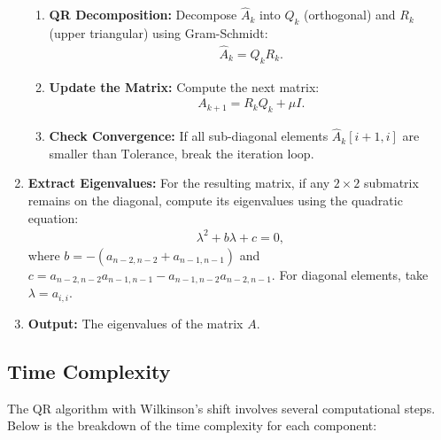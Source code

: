 \documentclass[journal]{IEEEtran}
\begin{document}
\begin{enumerate}
\begin{enumerate}
        \item \textbf{QR Decomposition:} Decompose $\hat{A}_k$ into $Q_k$ (orthogonal) and $R_k$ (upper triangular) using Gram-Schmidt:
        \begin{align}
        \hat{A}_k = Q_k R_k.
        \end{align}

        \item \textbf{Update the Matrix:} Compute the next matrix:
        \begin{align}
        A_{k+1} = R_k Q_k + \mu I.
        \end{align}

        \item \textbf{Check Convergence:} If all sub-diagonal elements $\hat{A}_k[i+1,i]$ are smaller than $\text{Tolerance}$, break the iteration loop.
    \end{enumerate}

    \item \textbf{Extract Eigenvalues:} 
    For the resulting matrix, if any $2 \times 2$ submatrix remains on the diagonal, compute its eigenvalues using the quadratic equation:
    \begin{align}
    \lambda^2 + b\lambda + c = 0,
    \end{align}
    where $b = -(a_{n-2,n-2} + a_{n-1,n-1})$ and $c = a_{n-2,n-2} a_{n-1,n-1} - a_{n-1,n-2} a_{n-2,n-1}$. For diagonal elements, take $\lambda = a_{i,i}$.

    \item \textbf{Output:} The eigenvalues of the matrix $A$.
\end{enumerate}
\subsection{Time Complexity}
The QR algorithm with Wilkinson's shift involves several computational steps. Below is the breakdown of the time complexity for each component:
\end{document}
